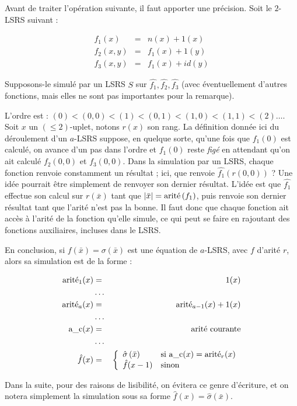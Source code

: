 \documentclass{report}
\begin{document}
	\begin{remark}
		Avant de traiter l'opération suivante, il faut apporter une précision. Soit le $2$-LSRS suivant :
		
		\begin{eqnarray}
			f_1(x) & = & n(x) + 1(x) \\
			f_2(x,y) & = & f_1(x) + 1(y) \\
			f_3(x,y) & = & f_1(x) + id(y)
		\end{eqnarray}
	
		Supposons-le simulé par un LSRS $S$ sur $\hat{f_1}, \hat{f_2}, \hat{f_3}$ (avec éventuellement d'autres fonctions, mais elles ne sont pas importantes pour la remarque).
		
		L'ordre est : $(0) < (0,0) < (1) < (0,1) < (1,0) < (1,1) < (2) \dots$. Soit $x$ un $\left(\leqslant 2\right)$-uplet, notons $r(x)$ son rang. La définition donnée ici du déroulement d'un $a$-LSRS suppose, en quelque sorte, qu'une fois que $f_1(0)$ est calculé, on avance d'un pas dans l'ordre et $f_1(0)$ reste \emph{figé} en attendant qu'on ait calculé $f_2(0,0)$ et $f_3(0,0)$. Dans la simulation par un LSRS, chaque fonction renvoie constamment un résultat ; ici, que renvoie $\hat{f_1}(r(0,0))$ ? Une idée pourrait être simplement de renvoyer son dernier résultat. L'idée est que $\hat{f_1}$ effectue son calcul sur $r\left(\bar{x}\right)$ tant que $\left|\bar{x}\right| = \text{arité}\left(f_1\right)$, puis renvoie son dernier résultat tant que l'arité n'est pas la bonne. Il faut donc que chaque fonction ait accès à l'arité de la fonction qu'elle simule, ce qui peut se faire en rajoutant des fonctions auxiliaires, incluses dans le LSRS. 
		
		En conclusion, si $f\left(\bar{x}\right) = \sigma\left(\bar{x}\right)$ est une équation de $a$-LSRS, avec $f$ d'arité $r$, alors sa simulation est de la forme :
	
		\begin{eqnarray}
			\text{arité}_1(x) & = & 1(x) \\
			 & \dots & \nonumber \\
			\text{arité}_a(x) & = & \text{arité}_{a-1}(x) + 1(x) \\
			 & \dots & \nonumber \\
			\text{a\_c}(x) & = & \text{arité courante} \\
			 & \dots & \nonumber \\
			\hat{f}(x) & = & \left\lbrace \begin{array}{ll} 
								\hat{\sigma}\left(\bar{x}\right) & \text{si $\text{a\_c}(x) = \text{arité}_r(x)$}\\
								\hat{f}(x-1) & \text{sinon}
								 \end{array} \right.
		\end{eqnarray}
	
		Dans la suite, pour des raisons de lisibilité, on évitera ce genre d'écriture, et on notera simplement la simulation sous sa forme $\hat{f}(x) = \hat{\sigma}\left(\bar{x}\right)$.
	\end{remark}
	
\end{document}
